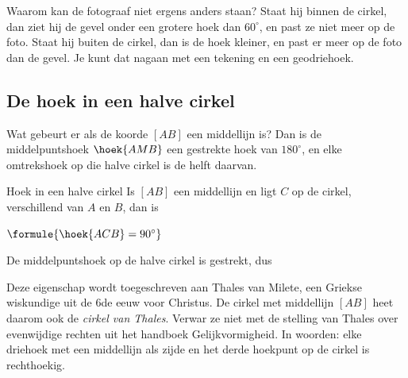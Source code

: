 Waarom kan de fotograaf niet ergens anders staan? Staat hij binnen de cirkel, dan ziet hij de gevel onder een grotere hoek dan $60^\circ$, en past ze niet meer op de foto. Staat hij buiten de cirkel, dan is de hoek kleiner, en past er meer op de foto dan de gevel. Je kunt dat nagaan met een tekening en een geodriehoek.

\begin{oefeningen}
\end{oefeningen}

\subsection{De hoek in een halve cirkel}

Wat gebeurt er als de koorde $[AB]$ een middellijn is? Dan is de middelpuntshoek $\hoek{AMB}$ een gestrekte hoek van $180^\circ$, en elke omtrekshoek op die halve cirkel is de helft daarvan.

\begin{theorie}
\begin{minipage}[t]{.64\linewidth}
\vspace{0pt}
\begin{stelling}{Hoek in een halve cirkel}
Is $[AB]$ een middellijn en ligt $C$ op de cirkel, verschillend van $A$ en $B$, dan is

\vspace{1mm}
\qquad $\formule{\hoek{ACB} = 90^\circ}$
\end{stelling}

\begin{bewijs}
De middelpuntshoek op de halve cirkel is gestrekt, dus
\end{bewijs}
\end{minipage}\hfill
\begin{minipage}[t]{.32\linewidth}
\vspace{0pt}
\centering
{}
\end{minipage}
\end{theorie}

Deze eigenschap wordt toegeschreven aan Thales van Milete, een Griekse wiskundige uit de 6de eeuw voor Christus. De cirkel met middellijn $[AB]$ heet daarom ook de \emph{cirkel van Thales}. Verwar ze niet met de stelling van Thales over evenwijdige rechten uit het handboek Gelijkvormigheid. In woorden: elke driehoek met een middellijn als zijde en het derde hoekpunt op de cirkel is rechthoekig.

